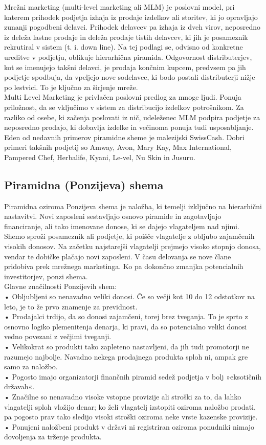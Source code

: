 \documentclass[letterpaper, titlepage, freqn]{article}
\begin{document}
Mrežni marketing (multi-level marketing ali MLM) je poslovni model, pri katerem prihodek podjetja izhaja iz prodaje izdelkov ali storitev, ki jo opravljajo zunanji pogodbeni delavci. Prihodek delavcev pa izhaja iz dveh virov, neposredno iz deleža lastne prodaje in deleža prodaje tistih delavcev, ki jih je posameznik rekrutiral v sistem (t. i. down line). Na tej podlagi se, odvisno od konkretne ureditve v podjetju, oblikuje hierarhična piramida. Odgovornost distributerjev, kot se imenujejo takšni delavci, je prodaja končnim kupcem, predvsem pa jih podjetje spodbuja, da vpeljejo nove sodelavce, ki bodo postali distributerji nižje po lestvici. To je ključno za širjenje mreže.\\
Multi Level Marketing je privlačen poslovni predlog za mnoge ljudi. Ponuja priložnost, da se vključimo v sistem za distribucijo izdelkov potrošnikom. Za razliko od osebe, ki začenja poslovati iz nič, udeleženec MLM podpira podjetje za neposredno prodajo, ki dobavlja izdelke in večinoma ponuja tudi usposabljanje.
Eden od nedavnih primerov piramidne sheme je malezijski SwissCash. Dobri primeri takšnih podjetij so Amway, Avon, Mary Kay, Max International, Pampered Chef, Herbalife, Kyani, Le-vel, Nu Skin in Jusuru.

\subsection{Piramidna (Ponzijeva) shema}
Piramidna oziroma Ponzijeva shema je naložba, ki temelji izključno na hierarhični nastavitvi. Novi zaposleni sestavljajo osnovo piramide in zagotavljajo financiranje, ali tako imenovane donose, ki se dajejo vlagateljem nad njimi. Shemo sproži posameznik ali podjetje, ki poišče vlagatelje z obljubo zajamčenih visokih donosov. Na začetku najstarejši vlagatelji prejmejo visoko stopnjo donosa, vendar te dobičke plačajo novi zaposleni. V času delovanja se nove člane pridobiva prek mrežnega marketinga. Ko pa dokončno zmanjka potencialnih investitorjev, ponzi shema.\\
Glavne značilnosti Ponzijevih shem:\\
•	Obljubljeni so nenavadno veliki donosi. Če so večji kot 10 do 12 odstotkov na leto, je to že prvo znamenje za previdnost.\\
•	Prodajalci trdijo, da so donosi zajamčeni, torej brez tveganja. To je sprto z osnovno logiko plemenitenja denarja, ki pravi, da so potencialno veliki donosi vedno povezani z večjimi tveganji.\\
•	Velikokrat so produkti tako zapleteno nastavljeni, da jih tudi promotorji ne razumejo najbolje. Navadno nekega prodajnega produkta sploh ni, ampak gre samo za naložbo.\\
•	Pogosto imajo organizatorji finančnih piramid sedež podjetja v bolj »eksotičnih državah«.\\
•	Značilne so nenavadno visoke vstopne provizije ali stroški za to, da lahko vlagatelji sploh vložijo denar; ko želi vlagatelj izstopiti oziroma naložbo prodati, pa pogosto prav tako sledijo visoki stroški oziroma neke vrste kazenske provizije.\\
•	Ponujeni naložbeni produkt v državi ni registriran oziroma ponudniki nimajo dovoljenja za trženje produkta.\\
\end{document}
